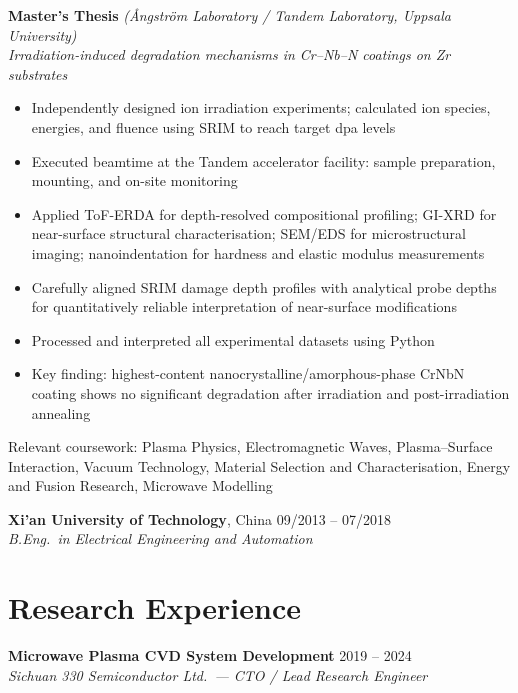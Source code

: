 \documentclass[a4paper,11pt]{article}
\begin{document}
\smallskip
\noindent\textbf{Master's Thesis} \textit{(Ångström Laboratory / Tandem Laboratory, Uppsala University)} \\
\textit{Irradiation-induced degradation mechanisms in Cr--Nb--N coatings on Zr substrates}
\begin{itemize}[noitemsep, topsep=2pt, leftmargin=*]
    \item Independently designed ion irradiation experiments; calculated ion species,
          energies, and fluence using SRIM to reach target dpa levels
    \item Executed beamtime at the Tandem accelerator facility: sample preparation,
          mounting, and on-site monitoring
    \item Applied ToF-ERDA for depth-resolved compositional profiling; GI-XRD for
          near-surface structural characterisation; SEM/EDS for microstructural imaging;
          nanoindentation for hardness and elastic modulus measurements
    \item Carefully aligned SRIM damage depth profiles with analytical probe depths
          for quantitatively reliable interpretation of near-surface modifications
    \item Processed and interpreted all experimental datasets using Python
    \item Key finding: highest-content nanocrystalline/amorphous-phase CrNbN coating
          shows no significant degradation after irradiation and post-irradiation annealing
\end{itemize}

\smallskip
\noindent Relevant coursework: Plasma Physics, Electromagnetic Waves, Plasma--Surface
Interaction, Vacuum Technology, Material Selection and Characterisation,
Energy and Fusion Research, Microwave Modelling

\medskip
\noindent\textbf{Xi'an University of Technology}, China \hfill 09/2013 -- 07/2018 \\
\textit{B.Eng.\ in Electrical Engineering and Automation}

\section*{Research Experience}

\noindent\textbf{Microwave Plasma CVD System Development} \hfill 2019 -- 2024 \\
\textit{Sichuan 330 Semiconductor Ltd.\ --- CTO / Lead Research Engineer}
\end{document}
